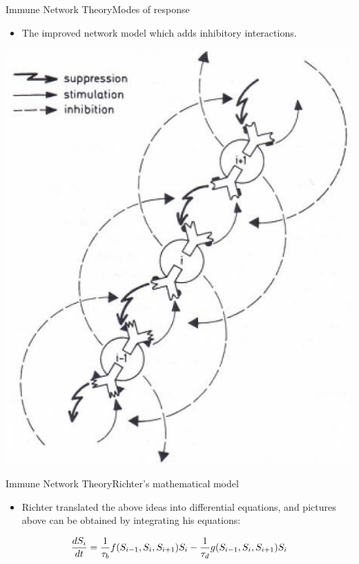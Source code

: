 \begin{frame}{Immune Network Theory}{Modes of response}
  \begin{itemize}
  \item \large
    The improved network model which adds inhibitory interactions.
  \end{itemize}
  \par
  \centering
    \includegraphics[scale=0.4] {img/Improved_network_model.png}
  \par
\end{frame}

\begin{frame}{Immune Network Theory}{Richter's mathematical model}
  \begin{itemize}
  \item \large
    Richter translated the above ideas into differential equations, and pictures above can be obtained by integrating his equations:
  \end{itemize}
  \begin{equation} \large{
    \frac{dS_{i}}{dt}=\frac{1}{\tau _{b}}f(S_{i-1},S_{i},S_{i+1})S_{i}-\frac{1}{\tau _{d}}g(S_{i-1},S_{i},S_{i+1})S_{i}}
  \end{equation}
\end{frame}

